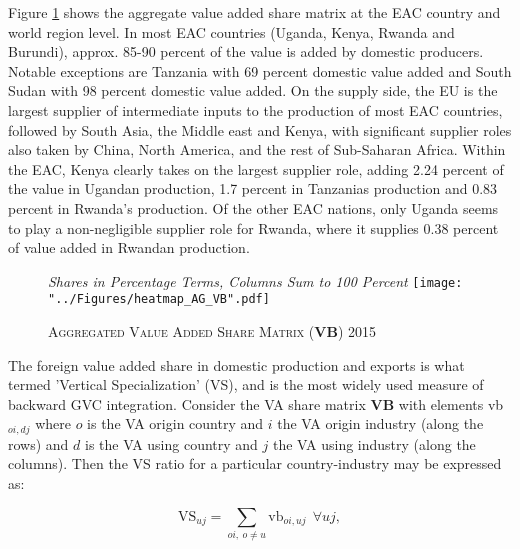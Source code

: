 \documentclass[a4paper]{article}
\begin{document}
Figure \ref{fig:wldVB} shows the aggregate value added share matrix at the EAC country and world region level. In most EAC countries (Uganda, Kenya, Rwanda and Burundi), approx. 85-90 percent of the value is added by domestic producers. Notable exceptions are Tanzania with 69 percent domestic value added and South Sudan with 98 percent domestic value added. On the supply side, the EU is the largest supplier of intermediate inputs to the production of most EAC countries, followed by South Asia, the Middle east and Kenya, with significant supplier roles also taken by China, North America, and the rest of Sub-Saharan Africa. Within the EAC, Kenya clearly takes on the largest supplier role, adding 2.24 percent of the value in Ugandan production, 1.7 percent in Tanzanias production and 0.83 percent in Rwanda's  production. Of the other EAC nations, only Uganda seems to play a non-negligible supplier role for Rwanda, where it supplies 0.38 percent of value added in Rwandan production. 

\begin{figure}[h!]
\centering
\caption{\label{fig:wldVB}\textsc{Aggregated Value Added Share Matrix (\textbf{VB}) 2015}}
\small{\textit{Shares in Percentage Terms, Columns Sum to 100 Percent}}
\texttt{[image: "../Figures/heatmap\_AG\_VB".pdf]} %
\end{figure}
\FloatBarrier


The foreign value added share in domestic production and exports is what \citet{hummels2001nature} termed 'Vertical Specialization' (VS), and is the most widely used measure of backward GVC integration. Consider the VA share matrix \textbf{VB} with elements vb$_{oi,dj}$ where $o$ is the VA origin country and $i$ the VA origin industry (along the rows) and $d$ is the VA using country and $j$ the VA using industry (along the columns). Then the VS ratio for a particular country-industry may be expressed as:

\begin{equation} \label{eq:VS}
\text{VS}_{uj} = \sum_{oi,\ o \neq  u} \text{vb}_{oi, uj}\ \ \forall uj,
\end{equation}
\end{document}
